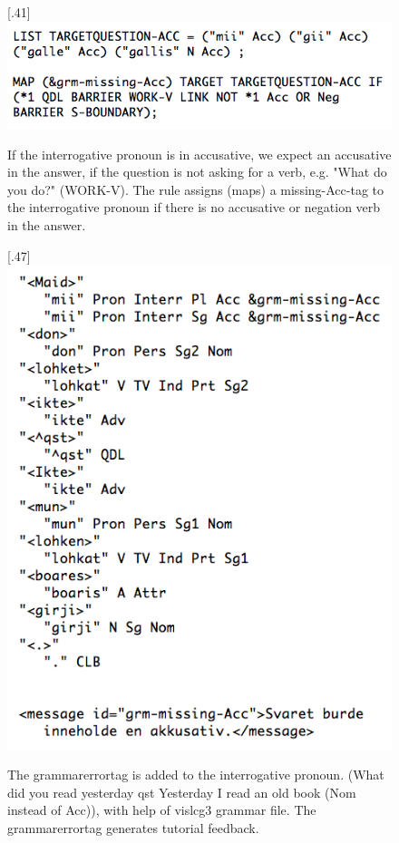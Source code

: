 \documentclass[11pt]{article}
\begin{document}
\begin{figure}[htbp]
\begin{center}
\scalebox{.41}[.41]{\includegraphics{presentation/img/pedcg3ny.png}}
\caption{If the interrogative pronoun is in accusative, we expect an accusative in the answer, if the question is not asking for a verb, e.g. "What do you do?" (WORK-V). The rule assigns (maps) a missing-Acc-tag to the interrogative pronoun if there is no accusative or negation verb in the answer.}
\label{cg3}
\end{center}
\end{figure}

\begin{figure}[htbp]
\begin{center}
\scalebox{.47}[.47]{\includegraphics{presentation/img/vasta_feedback.png}}
\caption{The grammarerrortag is added to the interrogative pronoun. (What did you read yesterday qst Yesterday I read an old book (Nom instead of Acc)), with help of vislcg3 grammar file. The grammarerrortag generates tutorial feedback.}
\label{maidlohket}
\end{center}
\end{figure}
\end{document}
